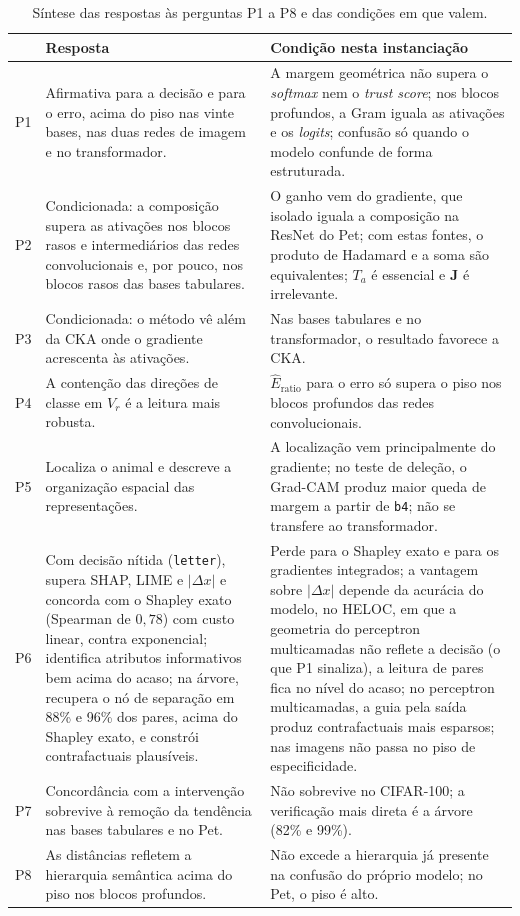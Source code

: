 \begin{table}[pos=htbp]
\centering
\caption{Síntese das respostas às perguntas P1 a P8 e das condições em que valem.}
\label{tab:res_sintese}
\footnotesize
\begin{tabular}{p{0.7cm}p{5.4cm}p{7.2cm}}
\hline
 & Resposta & Condição nesta instanciação \\
\hline
P1 & Afirmativa para a decisão e para o erro, acima do piso nas vinte bases, nas duas redes de imagem e no transformador. & A margem geométrica não supera o \textit{softmax} nem o \textit{trust score}; nos blocos profundos, a Gram iguala as ativações e os \textit{logits}; confusão só quando o modelo confunde de forma estruturada. \\
P2 & Condicionada: a composição supera as ativações nos blocos rasos e intermediários das redes convolucionais e, por pouco, nos blocos rasos das bases tabulares. & O ganho vem do gradiente, que isolado iguala a composição na ResNet do Pet; com estas fontes, o produto de Hadamard e a soma são equivalentes; $T_a$ é essencial e $\mathbf{J}$ é irrelevante. \\
P3 & Condicionada: o método vê além da CKA onde o gradiente acrescenta às ativações. & Nas bases tabulares e no transformador, o resultado favorece a CKA. \\
P4 & A contenção das direções de classe em $V_r$ é a leitura mais robusta. & $\widehat{E}_{\mathrm{ratio}}$ para o erro só supera o piso nos blocos profundos das redes convolucionais. \\
P5 & Localiza o animal e descreve a organização espacial das representações. & A localização vem principalmente do gradiente; no teste de deleção, o Grad-CAM produz maior queda de margem a partir de \texttt{b4}; não se transfere ao transformador. \\
P6 & Com decisão nítida (\texttt{letter}), supera SHAP, LIME e $|\Delta x|$ e concorda com o Shapley exato (Spearman de $0{,}78$) com custo linear, contra exponencial; identifica atributos informativos bem acima do acaso; na árvore, recupera o nó de separação em 88\% e 96\% dos pares, acima do Shapley exato, e constrói contrafactuais plausíveis. & Perde para o Shapley exato e para os gradientes integrados; a vantagem sobre $|\Delta x|$ depende da acurácia do modelo, no HELOC, em que a geometria do perceptron multicamadas não reflete a decisão (o que P1 sinaliza), a leitura de pares fica no nível do acaso; no perceptron multicamadas, a guia pela saída produz contrafactuais mais esparsos; nas imagens não passa no piso de especificidade. \\
P7 & Concordância com a intervenção sobrevive à remoção da tendência nas bases tabulares e no Pet. & Não sobrevive no CIFAR-100; a verificação mais direta é a árvore (82\% e 99\%). \\
P8 & As distâncias refletem a hierarquia semântica acima do piso nos blocos profundos. & Não excede a hierarquia já presente na confusão do próprio modelo; no Pet, o piso é alto. \\
\hline
\end{tabular}
\end{table}
